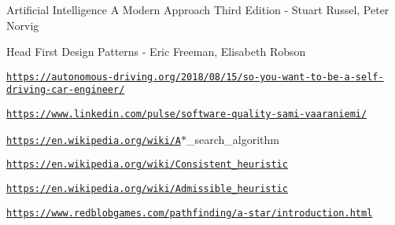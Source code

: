 \begin{DoxyItemize}
\item Artificial Intelligence A Modern Approach Third Edition -\/ Stuart Russel, Peter Norvig \item Head First Design Patterns -\/ Eric Freeman, Elisabeth Robson \item \href{https://autonomous-driving.org/2018/08/15/so-you-want-to-be-a-self-driving-car-engineer/}{\tt https\+://autonomous-\/driving.\+org/2018/08/15/so-\/you-\/want-\/to-\/be-\/a-\/self-\/driving-\/car-\/engineer/} \item \href{https://www.linkedin.com/pulse/software-quality-sami-vaaraniemi/}{\tt https\+://www.\+linkedin.\+com/pulse/software-\/quality-\/sami-\/vaaraniemi/} \item \href{https://en.wikipedia.org/wiki/A}{\tt https\+://en.\+wikipedia.\+org/wiki/A}$\ast$\+\_\+search\+\_\+algorithm \item \href{https://en.wikipedia.org/wiki/Consistent_heuristic}{\tt https\+://en.\+wikipedia.\+org/wiki/\+Consistent\+\_\+heuristic} \item \href{https://en.wikipedia.org/wiki/Admissible_heuristic}{\tt https\+://en.\+wikipedia.\+org/wiki/\+Admissible\+\_\+heuristic} \item \href{https://www.redblobgames.com/pathfinding/a-star/introduction.html}{\tt https\+://www.\+redblobgames.\+com/pathfinding/a-\/star/introduction.\+html} \end{DoxyItemize}
